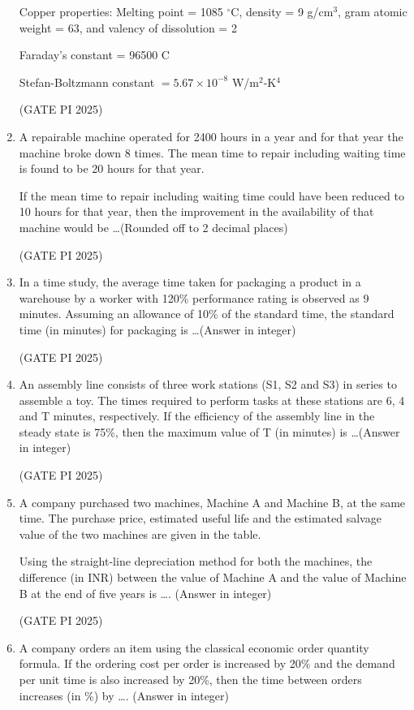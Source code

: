 \documentclass[journal,12pt,onecolumn]{IEEEtran}
\theoremstyle{remark}
\begin{document}
\begin{enumerate}
Copper properties: Melting point = 1085 $^\circ$C, density = 9 g/cm$^3$, gram atomic weight = 63, and valency of dissolution = 2

Faraday's constant = 96500 C

Stefan-Boltzmann constant $= 5.67 \times 10^{-8}$ W/m$^2$-K$^4$

\hfill (GATE PI 2025)

\item A repairable machine operated for 2400 hours in a year and for that year the machine broke down 8 times. The mean time to repair including waiting time is found to be 20 hours for that year.

If the mean time to repair including waiting time could have been reduced to 10 hours for that year, then the improvement in the availability of that machine would be \dots (Rounded off to 2 decimal places)

\hfill (GATE PI 2025)

\item In a time study, the average time taken for packaging a product in a warehouse by a worker with 120\% performance rating is observed as 9 minutes. Assuming an allowance of 10\% of the standard time, the standard time (in minutes) for packaging is \dots (Answer in integer)

\hfill (GATE PI 2025)

\item An assembly line consists of three work stations (S1, S2 and S3) in series to assemble a toy. The times required to perform tasks at these stations are 6, 4 and T minutes, respectively. If the efficiency of the assembly line in the steady state is 75\%, then the maximum value of T (in minutes) is \dots (Answer in integer)

\hfill (GATE PI 2025)


\item A company purchased two machines, Machine A and Machine B, at the same time. The purchase price, estimated useful life and the estimated salvage value of the two machines are given in the table.



Using the straight-line depreciation method for both the machines, the difference (in INR) between the value of Machine A and the value of Machine B at the end of five years is \dots . (Answer in integer)

\hfill (GATE PI 2025)

\item A company orders an item using the classical economic order quantity formula. If the ordering cost per order is increased by 20\% and the demand per unit time is also increased by 20\%, then the time between orders increases (in \%) by \dots . (Answer in integer)


\end{enumerate}
\end{document}
